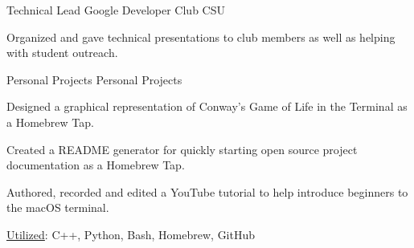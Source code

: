 

\begin{cventries}


    \cventry
    {Technical Lead} %
    {Google Developer Club } %
    {CSU} %
    {} %
    {
      \begin{cvitems} %
        \item {Organized and gave technical presentations to club members as well as helping with student outreach.}
      \end{cvitems}
    }


  \cventry
    {Personal Projects} %
    {Personal Projects} %
    {} %
    {} %
    {
      \begin{cvitems} %
        \item {Designed a graphical representation of Conway's Game of Life in the Terminal as a Homebrew Tap.}
        \item {Created a README generator for quickly starting open source project documentation as a Homebrew Tap.}
        \item {Authored, recorded and edited a YouTube tutorial to help introduce beginners to the macOS terminal.}
        \item {\underline{Utilized}: C++, Python, Bash, Homebrew, GitHub}
      \end{cvitems}
    }




\end{cventries}
